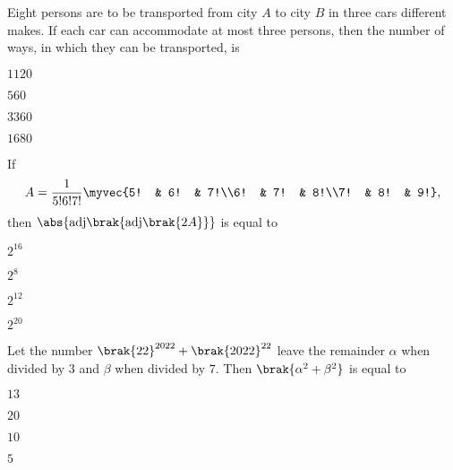     \item 
    Eight persons are to be transported from city $A$ to city $B$ in three cars different makes. If each car can accommodate at most three persons, then the number of ways, in which they can be transported, is

    \hfill{}

    \begin{enumerate}
    \begin{multicols}{4}
        \item $1120$
        \item $560$
        \item $3360$
        \item $1680$
    \end{multicols}
    \end{enumerate}

    \item 
    If 
    \begin{align*}
        A = \frac{1}{5!6!7!}\myvec{5! & 6! & 7!\\6! & 7! & 8!\\7! & 8! & 9!},
    \end{align*}
    then $\abs{\text{adj}\brak{\text{adj}\brak{2A}}}$ is equal to

    \hfill{}

    \begin{enumerate}
    \begin{multicols}{4}
        \item $2^{16}$
        \item $2^8$
        \item $2^{12}$
        \item $2^{20}$
    \end{multicols}
    \end{enumerate}

    \item 
    Let the number $\brak{22}^{2022} + \brak{2022}^{22}$ leave the remainder $\alpha$ when divided by $3$ and $\beta$ when divided by $7$. Then $\brak{\alpha^2 + \beta^2}$ is equal to

    \hfill{}

    \begin{enumerate}
    \begin{multicols}{4}
        \item $13$
        \item $20$
        \item $10$
        \item $5$
    \end{multicols}
    \end{enumerate}

